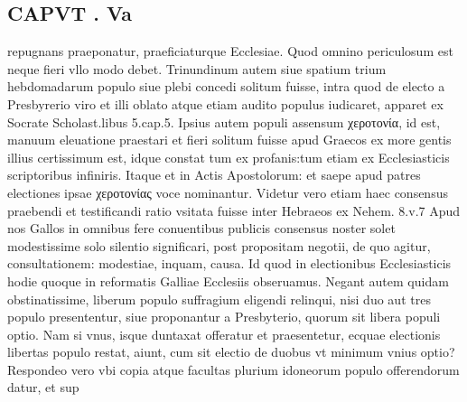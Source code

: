 \documentclass{article}
\begin{document}
\begin{pages}
\section*{CAPVT . Va }
\marginpar{[ p.355 ]}\pstart repugnans praeponatur, praeficiaturque Ecclesiae. Quod omnino periculosum est neque fieri vllo modo debet. Trinundinum autem siue spatium trium hebdomadarum populo siue plebi concedi solitum fuisse, intra quod de electo a Presbyrerio viro et illi oblato atque etiam audito populus iudicaret, apparet ex Socrate Scholast.libus  5.cap.5. Ipsius autem populi assensum χεροτονία, id est, manuum eleuatione praestari et fieri solitum fuisse apud Graecos ex more gentis illius certissimum est, idque constat tum ex profanis:tum etiam ex Ecclesiasticis scriptoribus infiniris. Itaque et in Actis Apostolorum: et saepe apud patres electiones ipsae χεροτονίας voce nominantur. Videtur vero etiam haec consensus praebendi et testificandi ratio vsitata fuisse inter Hebraeos ex Nehem. 8.v.7 Apud nos Gallos in omnibus fere conuentibus publicis consensus noster solet modestissime solo silentio significari, post propositam negotii, de quo agitur, consultationem: modestiae, inquam, causa. Id quod in electionibus Ecclesiasticis hodie quoque in reformatis Galliae Ecclesiis obseruamus. Negant autem quidam obstinatissime, liberum populo suffragium eligendi relinqui, nisi duo aut tres populo presententur, siue proponantur a Presbyterio, quorum sit libera populi optio. Nam si vnus, isque duntaxat offeratur et praesentetur, ecquae electionis libertas populo restat, aiunt, cum sit electio de duobus vt minimum vnius optio? Respondeo vero vbi copia atque facultas plurium idoneorum populo offerendorum datur, et sup\pend

\end{pages}
\end{document}

